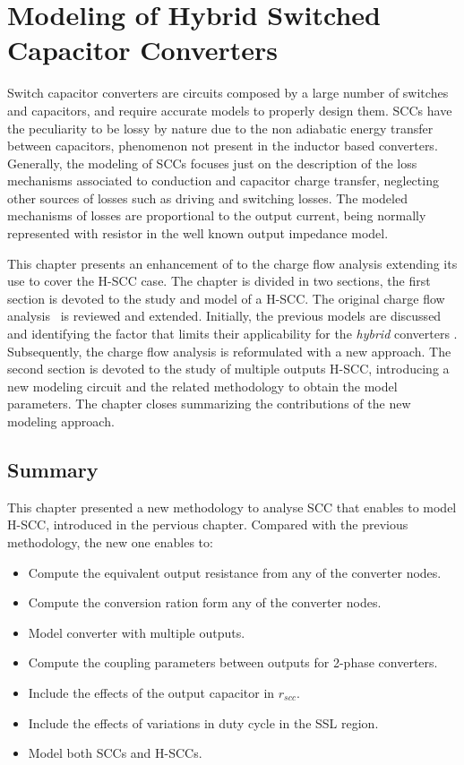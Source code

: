 \chapter[Modeling of H-SCC]{Modeling of Hybrid Switched Capacitor Converters}
\label{ch:modeling}
Switch capacitor converters are circuits composed by a large number of switches and capacitors, and require accurate models to properly design them. SCCs have the peculiarity to be lossy by nature due to the non adiabatic energy transfer between capacitors, phenomenon not present in the inductor based converters. Generally, the modeling of SCCs focuses just on the description of the loss mechanisms associated to conduction and capacitor charge transfer, neglecting other sources of losses such as driving and switching losses. The modeled mechanisms of losses are proportional to the output current, being  normally represented with resistor in the well known output impedance model.

This chapter presents an enhancement of  to the charge flow analysis extending its use to cover the H-SCC case.   The chapter is divided in two sections, the first section is devoted to the study and model of a H-SCC. The original charge flow analysis~\cite{95Makowski,Seeman:EECS-2009-78} is reviewed and extended. Initially, the previous models are discussed and identifying the factor that limits their applicability for the \emph{hybrid} converters . Subsequently, the charge flow analysis is reformulated with a new approach. The second section is devoted to the study of multiple outputs H-SCC, introducing a new modeling circuit and the related methodology to obtain the model parameters. The chapter closes summarizing the contributions of the new modeling approach.




\section{Summary}
This chapter presented a new methodology to analyse SCC that enables to model H-SCC, introduced in the pervious chapter. Compared with the previous methodology, the new one enables to:
\begin{itemize}
  \item Compute the equivalent output resistance from any of the converter nodes.
  \item Compute the conversion ration form any of the converter nodes.
  \item Model converter with multiple outputs.
  \item Compute the coupling parameters between outputs for 2-phase converters.
  \item Include the effects of the output capacitor in $r_{scc}$.
  \item Include the effects of variations in duty cycle in the SSL region.
  \item Model both SCCs and H-SCCs.
\end{itemize}


\clearpage

 